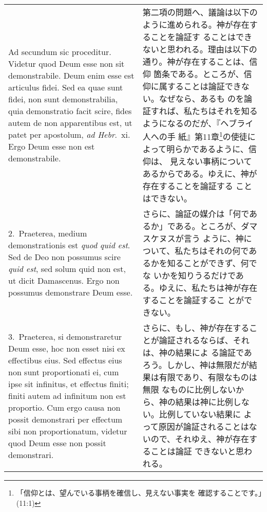 \documentclass[10pt]{jsarticle}
\begin{document}
\begin{longtable}{p{21em}p{21em}}


{\huge A}{\sc d secundum sic proceditur}. Videtur quod Deum esse non
sit demonstrabile. Deum enim esse est articulus fidei. Sed ea quae
sunt fidei, non sunt demonstrabilia, quia demonstratio facit scire,
fides autem de non apparentibus est, ut patet per apostolum, {\it ad
Hebr}.~{\sc xi}. Ergo Deum esse non est demonstrabile.


&

第二項の問題へ、議論は以下のように進められる。神が存在することを論証す
ることはできないと思われる。理由は以下の通り。神が存在することは、信仰
箇条である。ところが、信仰に属することは論証できない。なぜなら、あるも
のを論証すれば、私たちはそれを知るようになるのだが、『ヘブライ人への手
紙』第11章\footnote{「信仰とは、望んでいる事柄を確信し、見えない事実を
確認することです。」(11:1)}の使徒によって明らかであるように、信仰は、
見えない事柄についてあるからである。ゆえに、神が存在することを論証する
ことはできない。

\\



2.~{\sc Praeterea}, medium demonstrationis est {\it quod quid
 est}. Sed de Deo non possumus scire {\it quid est}, sed solum quid
 non est, ut dicit Damascenus. Ergo non possumus demonstrare Deum
 esse.

&

さらに、論証の媒介は「何であるか」である。ところが、ダマスケヌスが言う
ように、神について、私たちはそれの何であるかを知ることができず、何でな
いかを知りうるだけである。ゆえに、私たちは神が存在することを論証するこ
とができない。

\\


3.~{\sc Praeterea}, si demonstraretur Deum esse, hoc non esset nisi ex
effectibus eius. Sed effectus eius non sunt proportionati ei, cum ipse
sit infinitus, et effectus finiti; finiti autem ad infinitum non est
proportio. Cum ergo causa non possit demonstrari per effectum sibi non
proportionatum, videtur quod Deum esse non possit demonstrari.

&


さらに、もし、神が存在することが論証されるならば、それは、神の結果によ
る論証であろう。しかし、神は無限だが結果は有限であり、有限なものは無限
なものに比例しないから、神の結果は神に比例しない。比例していない結果に
よって原因が論証されることはないので、それゆえ、神が存在することは論証
できないと思われる。


\end{longtable}
\end{document}
